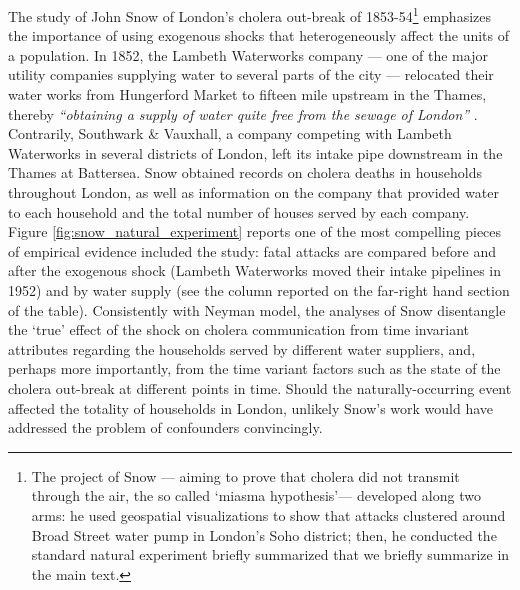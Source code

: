 \begin{refsection}
The study of John Snow of London's cholera out-break of 1853-54\footnote{The
project of Snow --- aiming to prove that cholera did not transmit through the
air, the so called `miasma hypothesis'--- developed along two arms: he used
geospatial visualizations to show that attacks clustered around Broad Street
water pump in London's Soho district; then, he conducted the standard natural
experiment briefly summarized that we briefly summarize in the main text.}
emphasizes the importance of using exogenous shocks that heterogeneously affect
the units of a population. In 1852, the Lambeth Waterworks company --- one of
the major utility companies supplying water to several parts of the city ---
relocated their water works from Hungerford Market to fifteen mile upstream in
the Thames, thereby \textit{``obtaining a supply of water quite free from the
sewage of London''} \parencite[][page 68]{snow_1855}. Contrarily, Southwark \&
Vauxhall, a company competing with Lambeth Waterworks in several districts of
London, left its intake pipe downstream in the Thames at Battersea. Snow
obtained records on cholera deaths in households throughout London, as well as
information on the company that provided water to each household and the total
number of houses served by each company. Figure
\ref{fig:snow_natural_experiment} reports one of the most compelling pieces of
empirical evidence included the study: fatal attacks are compared before and
after the exogenous shock (Lambeth Waterworks moved their intake pipelines in
1952) and by water supply (see the column reported on the far-right hand section
of the table). Consistently with Neyman model, the analyses of Snow disentangle
the `true' effect of the shock on cholera communication from time invariant
attributes regarding the households served by different water suppliers, and,
perhaps more importantly, from the time variant factors such as the state of the
cholera out-break at different points in time. Should the naturally-occurring
event affected the totality of households in London, unlikely Snow's work would
have addressed the problem of confounders convincingly.  


\end{refsection}
